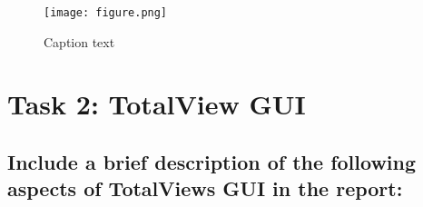 \documentclass{article}
\begin{document}
\begin{figure}[h!] %
 	\begin{center}
 		\texttt{[image: figure.png]} %
 		\caption{Caption text}
 		\label{fig:figureLabelName}
 	\end{center}
\end{figure}

\section{Task 2: TotalView GUI}

\subsection{Include a brief description of the following aspects of TotalViews GUI in the report:}
\end{document}
